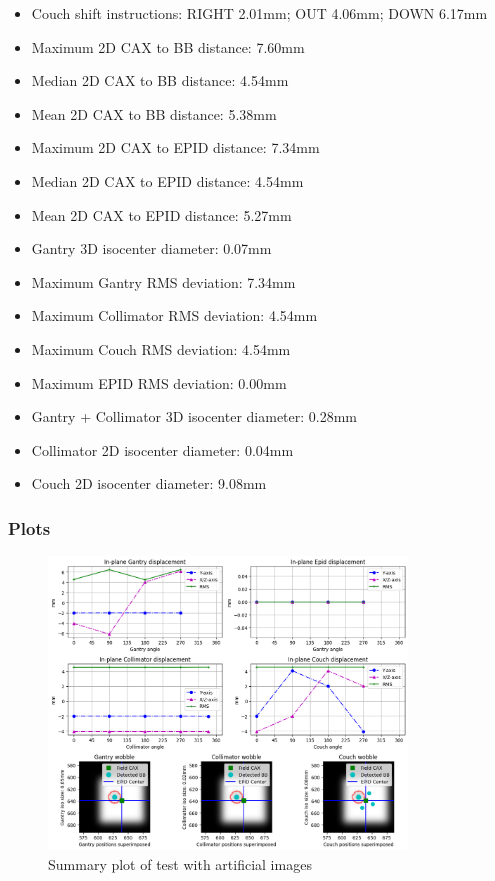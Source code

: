 \begin{itemize}

    \item Couch shift instructions: RIGHT 2.01mm; OUT 4.06mm; DOWN 6.17mm
    \item Maximum 2D CAX to BB distance: 7.60mm
    \item Median 2D CAX to BB distance: 4.54mm
    \item Mean 2D CAX to BB distance: 5.38mm
    \item Maximum 2D CAX to EPID distance: 7.34mm
    \item Median 2D CAX to EPID distance: 4.54mm
    \item Mean 2D CAX to EPID distance: 5.27mm
    \item Gantry 3D isocenter diameter: 0.07mm
    \item Maximum Gantry RMS deviation: 7.34mm
    \item Maximum Collimator RMS deviation: 4.54mm
    \item Maximum Couch RMS deviation: 4.54mm
    \item Maximum EPID RMS deviation: 0.00mm
    \item Gantry + Collimator 3D isocenter diameter: 0.28mm
    \item Collimator 2D isocenter diameter: 0.04mm
    \item Couch 2D isocenter diameter: 9.08mm
    
\end{itemize}

\subsubsection{Plots}

\begin{figure}[H]
    \centering
    \includegraphics[width=0.85\textwidth]{Content/Images/analysis_wl_artificial_summary_plot.png}
    \caption{Summary plot of test with artificial images}
\end{figure}

